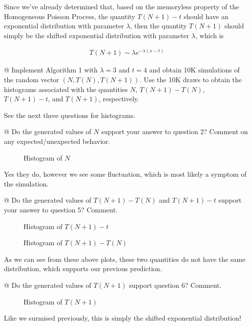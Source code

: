 \documentclass[10pt]{article}
\begin{document}
\begin{easylist}[enumerate]
    \p Since we've already determined that, based on the memoryless property of
    the Homogeneous Poisson Process, the quantity $T(N+1) - t$ should have an
    exponential distribution with parameter $\lambda$, then the quantity
    $T(N+1)$ should simply be the shifted exponential distribution with
    parameter $\lambda$, which is

    \begin{align*}
        T(N+1) \sim \lambda e^{-\lambda (x - t)}
    \end{align*}

    @ Implement Algorithm 1 with $\lambda = 3$ and $t = 4$ and obtain 10K
    simulations of the random vector $(N, T(N), T(N + 1))$. Use the 10K draws to
    obtain the histograms associated with the quantities $N$, $T(N+1) - T(N)$,
    $T(N+1)-t$, and $T(N+1)$, respectively.

    \p See the next three questions for histograms.

    @ Do the generated values of $N$ support your answer to question 2? Comment
    on any expected/unexpected behavior.

    \begin{figure}[H]
        \centering
        \caption{Histogram of $N$}
    \end{figure}

    Yes they do, however we see some fluctuation, which is most likely a symptom
    of the simulation.

    @ Do the generated values of $T(N+1) - T(N)$ and $T(N+1) - t$ support your
    answer to question 5? Comment.

    \begin{figure}[H]
        \centering
        \caption{Histogram of $T(N+1) - t$}
    \end{figure}

    \begin{figure}[H]
        \centering
        \caption{Histogram of $T(N+1) - T(N)$}
    \end{figure}

    As we can see from these above plots, these two quantities do not have the
    same distribution, which supports our previous prediction.

    @ Do the generated values of $T(N+1)$ support question 6? Comment.

    \begin{figure}[H]
        \centering
        \caption{Histogram of $T(N+1)$}
    \end{figure}

    Like we surmised previously, this is simply the shifted exponential
    distribution!
\end{easylist}
\end{document}

